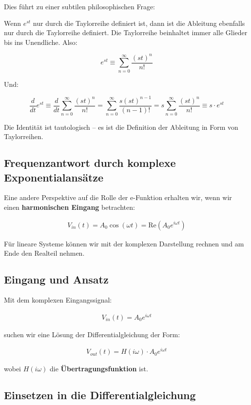\documentclass[a4paper,12pt,twoside]{report}
\theoremstyle{definition}
\begin{document}
Dies führt zu einer subtilen philosophischen Frage: 

Wenn $e^{st}$ nur durch die Taylorreihe definiert ist, dann ist die Ableitung ebenfalls nur durch die Taylorreihe definiert. Die Taylorreihe beinhaltet immer alle Glieder bis ins Unendliche. Also:

$$e^{st} \equiv \sum_{n=0}^{\infty} \frac{(st)^n}{n!}$$

Und:

$$\frac{d}{dt} e^{st} \equiv \frac{d}{dt} \sum_{n=0}^{\infty} \frac{(st)^n}{n!} = \sum_{n=0}^{\infty} \frac{s(st)^{n-1}}{(n-1)!} = s \sum_{n=0}^{\infty} \frac{(st)^n}{n!} \equiv s \cdot e^{st}$$

Die Identität ist tautologisch -- es ist die Definition der Ableitung in Form von Taylorreihen.


\subsection{Frequenzantwort durch komplexe Exponentialansätze}

Eine andere Perspektive auf die Rolle der e-Funktion erhalten wir, wenn wir einen \textbf{harmonischen Eingang} betrachten:

\begin{align}
	V_{in}(t) = A_0 \cos(\omega t) = \text{Re}(A_0 e^{i\omega t})
\end{align}

Für lineare Systeme können wir mit der komplexen Darstellung rechnen und am Ende den Realteil nehmen.

\subsection{Eingang und Ansatz}

Mit dem komplexen Eingangssignal:

\begin{align}
	V_{in}(t) = A_0 e^{i\omega t}
\end{align}

suchen wir eine Lösung der Differentialgleichung der Form:

\begin{align}
	V_{out}(t) = H(i\omega) \cdot A_0 e^{i\omega t}
\end{align}

wobei $H(i\omega)$ die \textbf{Übertragungsfunktion} ist.

\subsection{Einsetzen in die Differentialgleichung}
\end{document}
